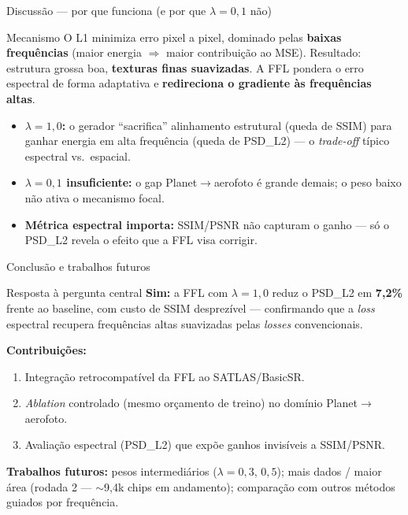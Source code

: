 \documentclass[aspectratio=169]{beamer}
\begin{document}
\begin{frame}{Discussão --- por que funciona (e por que $\lambda=0{,}1$ não)}

  \begin{block}{Mecanismo}
    O L1 minimiza erro pixel a pixel, dominado pelas \textbf{baixas frequências}
    (maior energia $\Rightarrow$ maior contribuição ao MSE). Resultado: estrutura
    grossa boa, \textbf{texturas finas suavizadas}. A FFL pondera o erro espectral
    de forma adaptativa e \textbf{redireciona o gradiente às frequências altas}.
  \end{block}

  \vspace{0.4em}
  \begin{itemize}
    \item \textbf{$\lambda=1{,}0$:} o gerador ``sacrifica'' alinhamento estrutural
          (queda de SSIM) para ganhar energia em alta frequência (queda de PSD\_L2)
          --- o \textit{trade-off} típico espectral vs.\ espacial.
    \item \textbf{$\lambda=0{,}1$ insuficiente:} o gap Planet$\to$aerofoto é grande
          demais; o peso baixo não ativa o mecanismo focal.
    \item \textbf{Métrica espectral importa:} SSIM/PSNR não capturam o ganho ---
          só o PSD\_L2 revela o efeito que a FFL visa corrigir.
  \end{itemize}

\end{frame}

\begin{frame}{Conclusão e trabalhos futuros}

  \begin{block}{Resposta à pergunta central}
    \textbf{Sim:} a FFL com $\lambda=1{,}0$ reduz o PSD\_L2 em \textbf{7,2\%} frente
    ao baseline, com custo de SSIM desprezível --- confirmando que a \textit{loss}
    espectral recupera frequências altas suavizadas pelas \textit{losses}
    convencionais.
  \end{block}

  \vspace{0.3em}
  \textbf{Contribuições:}
  \begin{enumerate}
    \item Integração retrocompatível da FFL ao SATLAS/BasicSR.
    \item \textit{Ablation} controlado (mesmo orçamento de treino) no domínio
          Planet$\to$aerofoto.
    \item Avaliação espectral (PSD\_L2) que expõe ganhos invisíveis a SSIM/PSNR.
  \end{enumerate}

  \vspace{0.3em}
  \textbf{Trabalhos futuros:} pesos intermediários ($\lambda=0{,}3$, $0{,}5$);
  mais dados / maior área (rodada 2 --- $\sim$9{,}4k chips em andamento);
  comparação com outros métodos guiados por frequência.

\end{frame}
\end{document}
